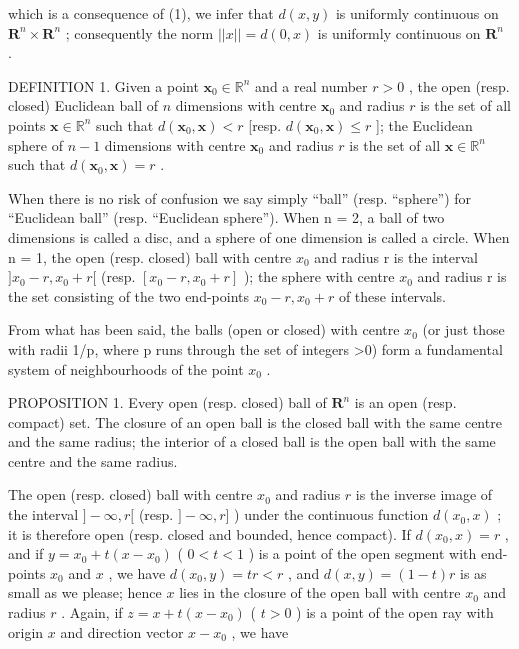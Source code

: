 which is a consequence of (1), we infer that \(d(x, y)\) is uniformly continuous on \(\mathbf{R}^n \times \mathbf{R}^n\) ; consequently the norm \(||x|| = d(0, x)\) is uniformly continuous on \(\mathbf{R}^n\) .

DEFINITION 1. Given a point \(\mathbf{x}_0 \in \mathbb{R}^n\) and a real number \(r > 0\) , the open (resp. closed) Euclidean ball of \(n\) dimensions with centre \(\mathbf{x}_0\) and radius \(r\) is the set of all points \(\mathbf{x} \in \mathbb{R}^n\) such that \(d(\mathbf{x}_0, \mathbf{x}) < r\) {[}resp. \(d(\mathbf{x}_0, \mathbf{x}) \leqslant r\) {]}; the Euclidean sphere of \(n - 1\) dimensions with centre \(\mathbf{x}_0\) and radius \(r\) is the set of all \(\mathbf{x} \in \mathbb{R}^n\) such that \(d(\mathbf{x}_0, \mathbf{x}) = r\) .

When there is no risk of confusion we say simply ``ball'' (resp. ``sphere'') for ``Euclidean ball'' (resp. ``Euclidean sphere''). When n = 2, a ball of two dimensions is called a disc, and a sphere of one dimension is called a circle. When n = 1, the open (resp. closed) ball with centre \(x_{0}\) and radius r is the interval \(]x_{0} - r, x_{0} + r[\) (resp. \([x_{0} - r, x_{0} + r]\) ); the sphere with centre \(x_{0}\) and radius r is the set consisting of the two end-points \(x_{0} - r, x_{0} + r\) of these intervals.

From what has been said, the balls (open or closed) with centre \(x_{0}\) (or just those with radii 1/p, where p runs through the set of integers \textgreater0) form a fundamental system of neighbourhoods of the point \(x_{0}\) .

PROPOSITION 1. Every open (resp. closed) ball of \(\mathbf{R}^n\) is an open (resp. compact) set. The closure of an open ball is the closed ball with the same centre and the same radius; the interior of a closed ball is the open ball with the same centre and the same radius.

The open (resp. closed) ball with centre \(x_0\) and radius \(r\) is the inverse image of the interval \(] - \infty, r[\) (resp. \(] - \infty, r]\) ) under the continuous function \(d(x_0, x)\) ; it is therefore open (resp. closed and bounded, hence compact). If \(d(x_0, x) = r\) , and if \(y = x_0 + t(x - x_0)\) ( \(0 < t < 1\) ) is a point of the open segment with end-points \(x_0\) and \(x\) , we have \(d(x_0, y) = tr < r\) , and \(d(x, y) = (1 - t)r\) is as small as we please; hence \(x\) lies in the closure of the open ball with centre \(x_0\) and radius \(r\) . Again, if \(z = x + t(x - x_0)\) ( \(t > 0\) ) is a point of the open ray with origin \(x\) and direction vector \(x - x_0\) , we have

